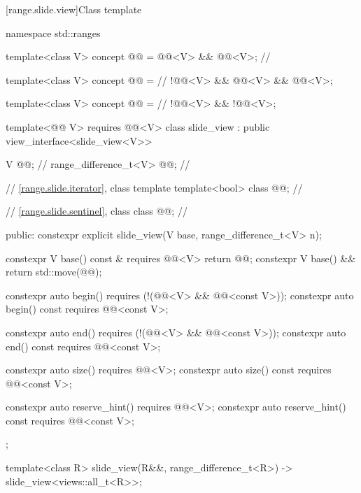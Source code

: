 [range.slide.view]{Class template }

%
%
\begin{codeblock}
namespace std::ranges {
  template<class V>
  concept @@ = @@<V> && @@<V>;       // \expos

  template<class V>
  concept @@ =                                            // \expos
    !@@<V> && @@<V> && @@<V>;

  template<class V>
  concept @@ =                                           // \expos
    !@@<V> && !@@<V>;

  template<@@ V>
    requires @@<V>
  class slide_view : public view_interface<slide_view<V>> {
    V @@;                            // \expos
    range_difference_t<V> @@;           // \expos

    // \ref{range.slide.iterator}, class template 
    template<bool> class @@;      // \expos

    // \ref{range.slide.sentinel}, class 
    class @@;                     // \expos

  public:
    constexpr explicit slide_view(V base, range_difference_t<V> n);

    constexpr V base() const & requires @@<V> { return @@; }
    constexpr V base() && { return std::move(@@); }

    constexpr auto begin()
      requires (!(@@<V> && @@<const V>));
    constexpr auto begin() const requires @@<const V>;

    constexpr auto end()
      requires (!(@@<V> && @@<const V>));
    constexpr auto end() const requires @@<const V>;

    constexpr auto size() requires @@<V>;
    constexpr auto size() const requires @@<const V>;

    constexpr auto reserve_hint() requires @@<V>;
    constexpr auto reserve_hint() const requires @@<const V>;
  };

  template<class R>
    slide_view(R&&, range_difference_t<R>) -> slide_view<views::all_t<R>>;
}
\end{codeblock}

